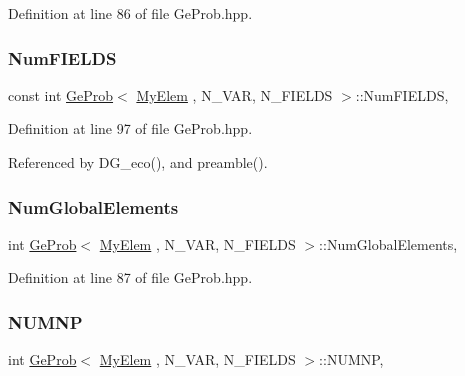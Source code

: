 Definition at line 86 of file Ge\+Prob.\+hpp.

\mbox{\label{classGeProb_adede55ee31a140d1cd8a9076ecdc41e1}} 
\subsubsection{\texorpdfstring{Num\+F\+I\+E\+L\+DS}{NumFIELDS}}
{\footnotesize\ttfamily const int \hyperlink{classGeProb}{Ge\+Prob}$<$ \hyperlink{DG__Prob_8h_a83cd887ced9a6587428f267e50cd4787}{My\+Elem} , N\+\_\+\+V\+AR, N\+\_\+\+F\+I\+E\+L\+DS $>$\+::Num\+F\+I\+E\+L\+DS\hspace{0.3cm}{\ttfamily [protected]}, {\ttfamily [inherited]}}



Definition at line 97 of file Ge\+Prob.\+hpp.



Referenced by D\+G\+\_\+eco(), and preamble().

\mbox{\label{classGeProb_af87232ea7d32eff7618f97a9792b3761}} 
\subsubsection{\texorpdfstring{Num\+Global\+Elements}{NumGlobalElements}}
{\footnotesize\ttfamily int \hyperlink{classGeProb}{Ge\+Prob}$<$ \hyperlink{DG__Prob_8h_a83cd887ced9a6587428f267e50cd4787}{My\+Elem} , N\+\_\+\+V\+AR, N\+\_\+\+F\+I\+E\+L\+DS $>$\+::Num\+Global\+Elements\hspace{0.3cm}{\ttfamily [protected]}, {\ttfamily [inherited]}}



Definition at line 87 of file Ge\+Prob.\+hpp.

\mbox{\label{classGeProb_adf7ed4cdeae11b7e6f15acc0ca7c1d21}} 
\subsubsection{\texorpdfstring{N\+U\+M\+NP}{NUMNP}}
{\footnotesize\ttfamily int \hyperlink{classGeProb}{Ge\+Prob}$<$ \hyperlink{DG__Prob_8h_a83cd887ced9a6587428f267e50cd4787}{My\+Elem} , N\+\_\+\+V\+AR, N\+\_\+\+F\+I\+E\+L\+DS $>$\+::N\+U\+M\+NP\hspace{0.3cm}{\ttfamily [protected]}, {\ttfamily [inherited]}}



